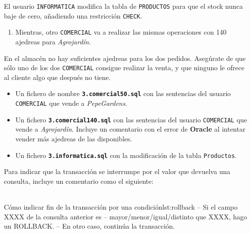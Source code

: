 \newpage

\begin{homeworkProblem}


  El usuario \texttt{INFORMATICA} modifica la tabla de \texttt{PRODUCTOS} para que el stock nunca baje de cero, añadiendo una restricción \texttt{CHECK}.
  
  {

    \begin{enumerate}
    \item Mientras, otro \texttt{COMERCIAL} va a realizar las mismas operaciones con 140 ajedreas para \textit{Agrojardín}.
    \end{enumerate}
  }
  En el almacén no hay suficientes ajedreas para los dos pedidos. Asegúrate de que sólo uno de los dos \texttt{COMERCIAL} consigue realizar la venta, y que ninguno le ofrece al cliente algo que después no tiene.
  

  \begin{Aviso}

    \begin{itemize}
    \item Un fichero de nombre \textbf{\texttt{3.comercial50.sql}} con las sentencias del usuario \texttt{COMERCIAL} que vende a \textit{PepeGardens}.
    \item Un fichero \textbf{\texttt{3.comercial140.sql}} con las sentencias del usuario \texttt{COMERCIAL} que vende a \textit{Agrojardín}. Incluye un comentario con el error de \textbf{Oracle} al intentar vender más ajedreas de las disponibles.
    \item Un fichero \textbf{\texttt{3.informatica.sql}} con la modificación de la tabla \texttt{Productos}.
    \end{itemize}

    Para indicar que la transacción se interrumpe por el valor que devuelva una consulta, incluye un comentario como el siguiente:
    \\
    \\
\begin{listadosql}{Cómo indicar fin de la transacción por una condición}{lst:rollback}
-- Si el campo XXXX de la consulta anterior es
-- mayor/menor/igual/distinto que XXXX, hago un ROLLBACK.
-- En otro caso, continúa la transacción.
\end{listadosql}
    

  \end{Aviso}

\end{homeworkProblem}

